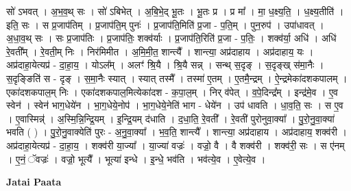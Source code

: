 \documentclass[17pt]{extarticle}
\begin{document}
सो॑ ऽभवत् । अ॒भ॒व॒थ् सः । सो॑ ऽबिभेत् । अ॒बि॒भे॒द् भू॒तः । भू॒तः प्र । प्र मा᳚ । मा॒ ध॒क्ष्य॒ति॒ । ध॒क्ष्य॒तीति॑ । इति॒ सः । स प्र॒जाप॑तिम् । प्र॒जाप॑ति॒म् पुनः॑ । प्र॒जाप॑ति॒मिति॑ प्र॒जा - प॒ति॒म् । पुन॒रुप॑ । उपा॑धावत् । अ॒धा॒व॒थ् सः । सः प्र॒जाप॑तिः । प्र॒जाप॑तिः॒ शक्व॑र्याः । प्र॒जाप॑ति॒रिति॑ प्र॒जा - प॒तिः॒ । शक्व॑र्या॒ अधि॑ । अधि॑ रे॒वती᳚म् । रे॒वती॒म् निः । निर॑मिमीत । अ॒मि॒मी॒त॒ शान्त्यै᳚ । शान्त्या॒ अप्र॑दाहाय । अप्र॑दाहाय॒ यः । अप्र॑दाहा॒येत्यप्र॑ - दा॒हा॒य॒ । योऽल᳚म् । अलꣳ॑ श्रि॒यै । श्रि॒यै सन्न् । सन्थ् स॒दृङ् । स॒दृङ्ख् स॑मा॒नैः । स॒दृङ्ङिति॑ स - दृङ् । स॒मा॒नैः स्यात् । स्यात् तस्मै᳚ । तस्मा॑ ए॒तम् । ए॒तमै॒न्द्रम् । ऐ॒न्द्रमेका॑दशकपालम् । एका॑दशकपाल॒म् निः । एका॑दशकपाल॒मित्येका॑दश - क॒पा॒ल॒म् । निर् व॑पेत् । व॒पे॒दिन्द्र᳚म् । इन्द्र॑मे॒व । ए॒व स्वेन॑ । स्वेन॑ भाग॒धेये॑न । भा॒ग॒धेये॒नोप॑ । भा॒ग॒धेये॒नेति॑ भाग - धेये॑न । उप॑ धावति । धा॒व॒ति॒ सः । स ए॒व । ए॒वास्मिन्न्॑ । अ॒स्मि॒न्नि॒न्द्रि॒यम् । इ॒न्द्रि॒यम् द॑धाति । द॒धा॒ति॒ रे॒वती᳚ । रे॒वती॑ पुरोनुवा॒क्या᳚ । पु॒रो॒नु॒वा॒क्या॑ भवति ( ) । पु॒रो॒नु॒वाक्येति॑ पुरः - अ॒नु॒वा॒क्या᳚ । भ॒व॒ति॒ शान्त्यै᳚ । शान्त्या॒ अप्र॑दाहाय । अप्र॑दाहाय॒ शक्व॑री । अप्र॑दाहा॒येत्यप्र॑ - दा॒हा॒य॒ । शक्व॑री या॒ज्या᳚ । या॒ज्या॑ वज्रः॑ । वज्रो॒ वै । वै शक्व॑री । शक्व॑री॒ सः । स ए॑नम् । ए॒नं॒ ॅवज्रः॑ । वज्रो॒ भूत्यै᳚ । भूत्या॑ इन्धे । इ॒न्धे॒ भव॑ति । भव॑त्ये॒व । ए॒वेत्ये॒व । \newline

\textbf{Jatai Paata} \newline
\end{document}
